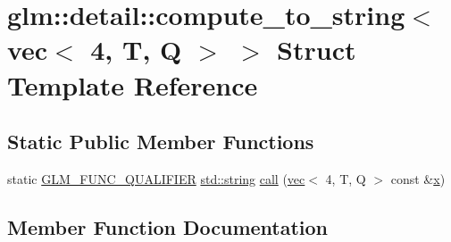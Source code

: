 \hypertarget{structglm_1_1detail_1_1compute__to__string_3_01vec_3_014_00_01_t_00_01_q_01_4_01_4}{}\section{glm\+:\+:detail\+:\+:compute\+\_\+to\+\_\+string$<$ vec$<$ 4, T, Q $>$ $>$ Struct Template Reference}
\label{structglm_1_1detail_1_1compute__to__string_3_01vec_3_014_00_01_t_00_01_q_01_4_01_4}
\subsection*{Static Public Member Functions}
\begin{DoxyCompactItemize}
\item 
static \hyperlink{setup_8hpp_a33fdea6f91c5f834105f7415e2a64407}{G\+L\+M\+\_\+\+F\+U\+N\+C\+\_\+\+Q\+U\+A\+L\+I\+F\+I\+ER} \hyperlink{_s_d_l__opengl__glext_8h_ae84541b4f3d8e1ea24ec0f466a8c568b}{std\+::string} \hyperlink{structglm_1_1detail_1_1compute__to__string_3_01vec_3_014_00_01_t_00_01_q_01_4_01_4_a7ad9df3e448b98637f2fa56c1b20817d}{call} (\hyperlink{structglm_1_1vec}{vec}$<$ 4, T, Q $>$ const \&\hyperlink{_s_d_l__opengl_8h_ad0e63d0edcdbd3d79554076bf309fd47}{x})
\end{DoxyCompactItemize}


\subsection{Member Function Documentation}
\mbox{\label{structglm_1_1detail_1_1compute__to__string_3_01vec_3_014_00_01_t_00_01_q_01_4_01_4_a7ad9df3e448b98637f2fa56c1b20817d}} 
